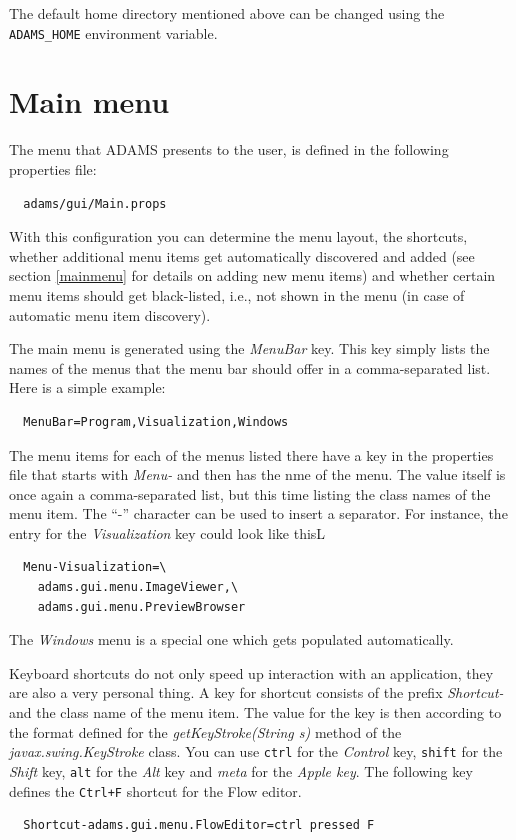\noindent The default home directory mentioned above can be changed using
the \texttt{ADAMS\_HOME} environment variable.

\section{Main menu}
The menu that ADAMS presents to the user, is defined in the following properties
file:
\begin{verbatim}
  adams/gui/Main.props
\end{verbatim}
With this configuration you can determine the menu layout, the shortcuts, whether additional
menu items get automatically discovered and added (see section \ref{mainmenu} 
for details on adding new menu items) and whether certain menu items should
get black-listed, i.e., not shown in the menu (in case of automatic menu
item discovery).

The main menu is generated using the \textit{MenuBar} key. This key simply lists
the names of the menus that the menu bar should offer in a comma-separated
list. Here is a simple example:
\begin{verbatim}
  MenuBar=Program,Visualization,Windows
\end{verbatim}
The menu items for each of the menus listed there have a key in the properties
file that starts with \textit{Menu-} and then has the nme of the menu. The value
itself is once again a comma-separated list, but this time listing the class
names of the menu item. The ``-'' character can be used to insert a separator.
For instance, the entry for the \textit{Visualization} key could look like thisL
\begin{verbatim}
  Menu-Visualization=\
    adams.gui.menu.ImageViewer,\
    adams.gui.menu.PreviewBrowser
\end{verbatim}
The \textit{Windows} menu is a special one which gets populated automatically. 

\heading{Shortcuts}
Keyboard shortcuts do not only speed up interaction with an application, they 
are also a very personal thing. A key for shortcut consists of the prefix
\textit{Shortcut-} and the class name of the menu item. The value for the 
key is then according to the format defined for the \textit{getKeyStroke(String s)}
method of the \textit{javax.swing.KeyStroke} class. You can use \texttt{ctrl}
for the \textit{Control} key, \texttt{shift} for the \textit{Shift} key,
\texttt{alt} for the \textit{Alt} key and \textit{meta} for the 
\textit{Apple key}. The following key defines the \texttt{Ctrl+F} shortcut
for the Flow editor.
\begin{verbatim}
  Shortcut-adams.gui.menu.FlowEditor=ctrl pressed F
\end{verbatim}

